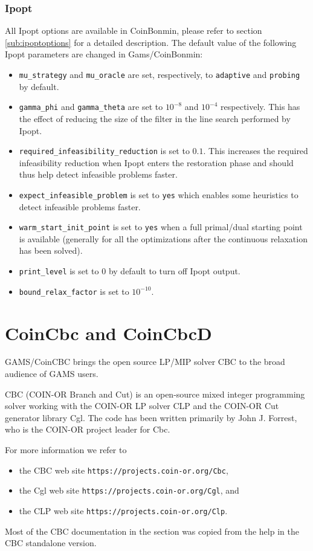 \subsubsection{Ipopt}
All Ipopt options are available in CoinBonmin, please refer to section \ref{sub:ipoptoptions} for a detailed description.
The default value of the following Ipopt parameters are changed in Gams/CoinBonmin:
\begin{itemize}
\item \texttt{mu\_strategy} and \texttt{mu\_oracle} are set, respectively, to {\tt adaptive} and {\tt probing} by default.
\item \texttt{gamma\_phi} and \texttt{gamma\_theta} are set to $10^{-8}$ and $10^{-4}$ respectively. This has the effect of reducing the size of the filter in the line search performed by Ipopt.
\item \texttt{required\_infeasibility\_reduction} is set to $0.1$.
This increases the required infeasibility reduction when Ipopt enters the restoration phase and should thus help
detect infeasible problems faster.
\item \texttt{expect\_infeasible\_problem} is set to {\tt yes} which enables some heuristics to detect infeasible problems faster.
\item \texttt{warm\_start\_init\_point} is set to {\tt yes} when a full primal/dual starting point is available (generally for all the optimizations after the continuous relaxation has been solved).
\item \texttt{print\_level} is set to $0$ by default to turn off Ipopt output.
\item \texttt{bound\_relax\_factor} is set to $10^{-10}$.
\end{itemize}

\section{CoinCbc and CoinCbcD}
\label{sec:coincbc}
\hypertarget{sec:coincbc}{}

GAMS/CoinCBC brings the open source LP/MIP solver CBC to the broad audience of GAMS users.

CBC (COIN-OR Branch and Cut) is an open-source mixed integer programming solver working with the COIN-OR LP solver CLP and the COIN-OR Cut generator library Cgl.
The code has been written primarily by John J. Forrest, who is the COIN-OR project leader for Cbc.

For more information we refer to
\begin{itemize}
\item the CBC web site \texttt{https://projects.coin-or.org/Cbc},
\item the Cgl web site \texttt{https://projects.coin-or.org/Cgl}, and
\item the CLP web site \texttt{https://projects.coin-or.org/Clp}.
\end{itemize}
Most of the CBC documentation in the section was copied from the help in the CBC standalone version.


